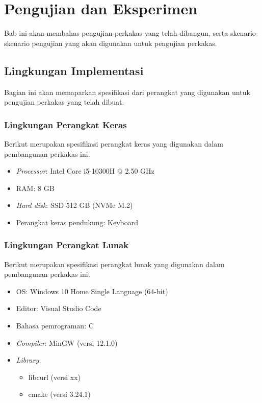 \chapter{Pengujian dan Eksperimen}
\label{chap:testing}

Bab ini akan membahas pengujian perkakas yang telah dibangun, serta skenario-skenario pengujian yang akan digunakan untuk pengujian perkakas.

\section{Lingkungan Implementasi}
\label{sec:testing-specs}

Bagian ini akan memaparkan spesifikasi dari perangkat yang digunakan untuk pengujian perkakas yang telah dibuat. 

\subsection{Lingkungan Perangkat Keras}
\label{sec:testing-specs-hardware}

Berikut merupakan spesifikasi perangkat keras yang digunakan dalam pembangunan perkakas ini:

\begin{itemize}
	\item \textit{Processor}: Intel\logoregistered\xspace Core\logotrademark\xspace i5-10300H @ 2.50 GHz
	\item RAM: 8 GB
	\item \textit{Hard disk}: SSD 512 GB (NVMe\logotrademark\xspace M.2)
	\item Perangkat keras pendukung: Keyboard
\end{itemize}

\subsection{Lingkungan Perangkat Lunak}
\label{sec:testing-specs-software}

Berikut merupakan spesifikasi perangkat lunak yang digunakan dalam pembangunan perkakas ini:

\begin{itemize}
	\item OS: Windows 10 Home Single Language (64-bit)
	\item Editor: Visual Studio Code
	\item Bahasa pemrograman: C
	\item \textit{Compiler}: MinGW (versi 12.1.0)
	\item \textit{Library}:
	
	\begin{itemize}
		\item libcurl (versi xx)
		\item cmake (versi 3.24.1)
	\end{itemize}
	
\end{itemize}

